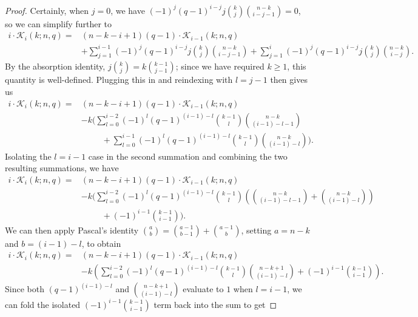 \documentclass{article}
\def\K{\mathcal{K}}
\numberwithin{equation}{section}
\theoremstyle{plain}
\begin{document}
\begin{proof}
    Certainly, when $j = 0$, we have $(-1)^j (q - 1)^{i - j} j \binom{k}{j} \binom{n - k}{i - j - 1} = 0$, so we can simplify further to
    \begin{align*}
        i \cdot \K_i(k; n, q) ={} & (n - k - i + 1)(q - 1) \cdot \K_{i - 1}(k; n, q) \\
        & + \sum_{j = 1}^{i - 1} (-1)^j (q - 1)^{i - j} j \binom{k}{j} \binom{n - k}{i - j - 1} + \sum_{j = 1}^i (-1)^j (q - 1)^{i - j} j \binom{k}{j} \binom{n - k}{i - j}.
    \end{align*}
    By the absorption identity, $j\binom{k}{j} = k\binom{k - 1}{j - 1}$; since we have required $k \ge 1$, this quantity is well-defined. Plugging this in and reindexing with $l = j - 1$ then gives us
    \begin{align*}
        i \cdot \K_i(k; n, q) ={} & (n - k - i + 1)(q - 1) \cdot \K_{i - 1}(k; n, q) \\
        & - k\Biggl(\sum_{l = 0}^{i - 2} (-1)^l (q - 1)^{(i - 1) - l} \binom{k - 1}{l} \binom{n - k}{(i - 1) - l - 1} \\
        & \phantom{\; - k\Biggl(} + \sum_{l = 0}^{i - 1} (-1)^l (q - 1)^{(i - 1) - l} \binom{k - 1}{l} \binom{n - k}{(i - 1) - l}\Biggr).
    \end{align*}
    Isolating the $l = i - 1$ case in the second summation and combining the two resulting summations, we have
    \begin{align*}
        i \cdot \K_i(k; n, q) ={} & (n - k - i + 1)(q - 1) \cdot \K_{i - 1}(k; n, q) \\
        & - k\Biggl(\sum_{l = 0}^{i - 2} (-1)^l (q - 1)^{(i - 1) - l} \binom{k - 1}{l} {\left(\binom{n - k}{(i - 1) - l - 1} + \binom{n - k}{(i - 1) - l}\right)} \\
        & \phantom{\; - k\Biggl(} + (-1)^{i - 1} \binom{k - 1}{i - 1}\Biggr).
    \end{align*}
    We can then apply Pascal's identity $\binom{a}{b} = \binom{a - 1}{b - 1} + \binom{a - 1}{b}$, setting $a = n - k$ and $b = (i - 1) - l$, to obtain
    \begin{align*}
        i \cdot \K_i(k; n, q) ={} & (n - k - i + 1)(q - 1) \cdot \K_{i - 1}(k; n, q) \\
        & - k{\left(\sum_{l = 0}^{i - 2} (-1)^l (q - 1)^{(i - 1) - l} \binom{k - 1}{l} \binom{n - k + 1}{(i - 1) - l} + (-1)^{i - 1} \binom{k - 1}{i - 1}\right)}.
    \end{align*}
    Since both $(q - 1)^{(i - 1) - l}$ and $\binom{n - k + 1}{(i - 1) - l}$ evaluate to $1$ when $l = i - 1$, we can fold the isolated $(-1)^{i - 1} \binom{k - 1}{i - 1}$ term back into the sum to get

\end{proof}
\end{document}
